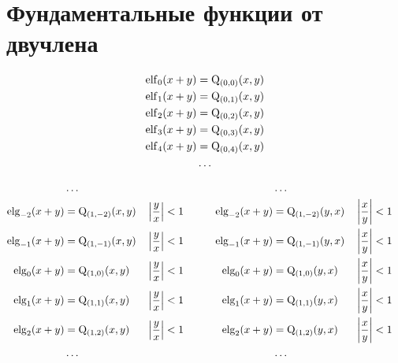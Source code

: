 
\section{Фундаментальные функции от двучлена}

\begin{equation*} \begin{aligned}
\operatorname{elf}_0(x + y) &= \mathrm{Q}_{(0,0)}(x, y) \\
\operatorname{elf}_1(x + y) &= \mathrm{Q}_{(0,1)}(x, y) \\
\operatorname{elf}_2(x + y) &= \mathrm{Q}_{(0,2)}(x, y) \\
\operatorname{elf}_3(x + y) &= \mathrm{Q}_{(0,3)}(x, y) \\
\operatorname{elf}_4(x + y) &= \mathrm{Q}_{(0,4)}(x, y) \\
&\ldots \\
\end{aligned} \end{equation*}

\begin{equation*} \begin{aligned}
&\ldots &&&&& &\ldots \\
%
\elg_{-2}(x + y) &= \mathrm{Q}_{(1,-2)}(x, y) &
&\left| \frac{y}{x} \right| < 1 &
&\quad &
\elg_{-2}(x + y) &= \mathrm{Q}_{(1,-2)}(y, x) & 
&\left| \frac{x}{y} \right| < 1 \\
%
\elg_{-1}(x + y) &= \mathrm{Q}_{(1,-1)}(x, y) & 
&\left| \frac{y}{x} \right| < 1 &
&\quad &
\elg_{-1}(x + y) &= \mathrm{Q}_{(1,-1)}(y, x) & 
&\left| \frac{x}{y} \right| < 1 \\
%
\elg_0(x + y) &= \mathrm{Q}_{(1,0)}(x, y) & 
&\left| \frac{y}{x} \right| < 1 &
&\quad &
\elg_0(x + y) &= \mathrm{Q}_{(1,0)}(y, x) & 
&\left| \frac{x}{y} \right| < 1 \\
%
\elg_1(x + y) &= \mathrm{Q}_{(1,1)}(x, y) & 
&\left| \frac{y}{x} \right| < 1 &
&\quad &
\elg_1(x + y) &= \mathrm{Q}_{(1,1)}(y, x) & 
&\left| \frac{x}{y} \right| < 1 \\
%
\elg_2(x + y) &= \mathrm{Q}_{(1,2)}(x, y) & 
&\left| \frac{y}{x} \right| < 1 &
&\quad &
\elg_2(x + y) &= \mathrm{Q}_{(1,2)}(y, x) & 
&\left| \frac{x}{y} \right| < 1 \\
%
&\ldots &&&&& &\ldots \\
\end{aligned} \end{equation*}